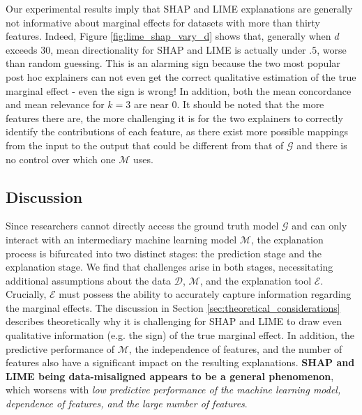 \documentclass[12pt]{article}  %
\newcommand{\mG}{\mathcal{G}}
\newcommand{\mM}{\mathcal{M}}
\begin{document}
    
    Our experimental results imply that SHAP and LIME explanations are generally not informative about marginal effects for datasets with more than thirty features. Indeed, Figure \ref{fig:lime_shap_vary_d} shows that, generally when $d$ exceeds $30$, mean directionality for SHAP and LIME is actually under $.5$, worse than random guessing. This is an alarming sign because the two most popular post hoc explainers can not even get the correct qualitative estimation of the true marginal effect - even the sign is wrong! In addition, both the mean concordance and mean relevance for $k=3$ are near $0$. It should be noted that the more features there are, the more challenging it is for the two explainers to correctly identify the contributions of each feature, as there exist more possible mappings from the input to the output that could be different from that of $\mG$ and there is no control over which one $\mM$ uses.

\vspace{-3mm}  \subsection{Discussion}\vspace{-3mm}
      Since researchers cannot directly access the ground truth model $\mathcal{G}$ and can only interact with an intermediary machine learning model $\mathcal{M}$, the explanation process is bifurcated into two distinct stages: the prediction stage and the explanation stage. 
      We find that challenges arise in both stages, necessitating additional assumptions about the data $\mathcal{D}$, $\mathcal{M}$, and the explanation tool $\mathcal{E}$. Crucially, $\mathcal{E}$ must possess the ability to accurately capture information regarding the marginal effects. The discussion in Section \ref{sec:theoretical_considerations} describes theoretically why it is challenging for SHAP and LIME to draw even qualitative information (e.g. the sign) of the true marginal effect. In addition, the predictive performance of $\mathcal{M}$, the independence of features, and the number of features also have a significant impact on the resulting explanations. %
      \textbf{SHAP and LIME being data-misaligned appears to be a general phenomenon}, which worsens with \textit{low predictive performance of the machine learning model, dependence of features, and the large number of features}. 
\end{document}
